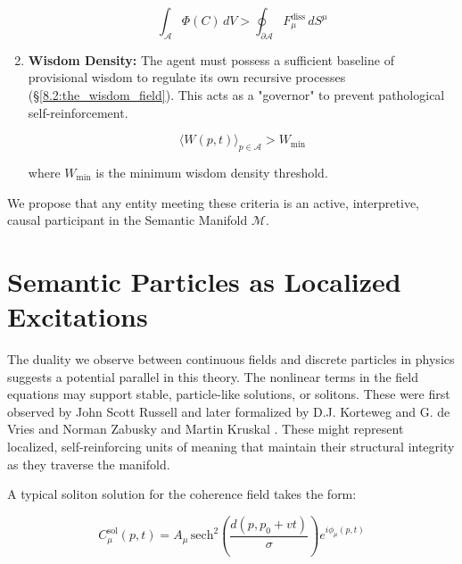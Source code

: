 \begin{enumerate}
    \begin{equation}
        \int_{\mathcal{A}} \Phi(C) \, dV > \oint_{\partial \mathcal{A}} F_\mu^{\text{diss}} \, dS^\mu
    \end{equation}

    \item \textbf{Wisdom Density:} The agent must possess a sufficient baseline of provisional wisdom to regulate its own recursive processes (\S\ref{8.2:the_wisdom_field}). This acts as a "governor" to prevent pathological self-reinforcement.

    \begin{equation}
        \langle W(p,t) \rangle_{p \in \mathcal{A}} > W_{\text{min}}
    \end{equation}
    
    where \(W_{\text{min}}\) is the minimum wisdom density threshold.

\end{enumerate}

We propose that any entity meeting these criteria is an active, interpretive, causal participant in the Semantic Manifold \(\mathcal{M}\).


\section{Semantic Particles as Localized Excitations}
\label{13.6:semantic_particles_as_localized_excitations}

The duality we observe between continuous fields and discrete particles in physics suggests a potential parallel in this theory. The nonlinear terms in the field equations may support stable, particle-like solutions, or solitons. These were first observed by John Scott Russell \autocite{Russell1845} and later formalized by D.J. Korteweg and G. de Vries \autocite{KortewegdeVries1895} and Norman Zabusky and Martin Kruskal \autocite{ZabuskyKruskal1965}. These might represent localized, self-reinforcing units of meaning that maintain their structural integrity as they traverse the manifold.

A typical soliton solution for the coherence field takes the form:

\begin{equation}
C_\mu^{\mathrm{sol}}(p, t) = A_\mu\, \mathrm{sech}^2\left(\frac{d(p, p_0 + vt)}{\sigma}\right) e^{i\phi_\mu(p, t)}
\end{equation}

